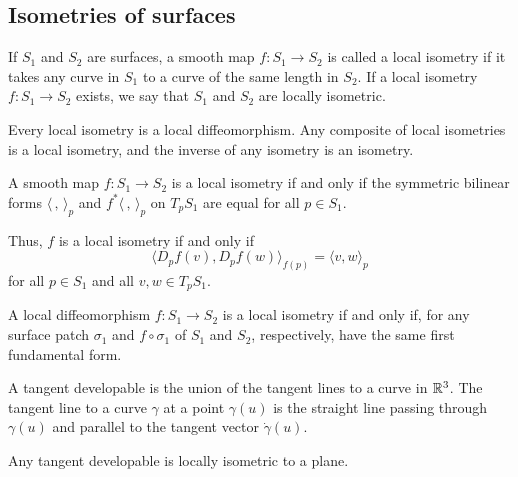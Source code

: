 \subsection{Isometries of surfaces}

\begin{defn}
  If $S_1$ and $S_2$ are surfaces, a smooth map $f: S_1 \to S_2$ is called
  a local isometry if it takes any curve in $S_1$ to a curve of the same
  length in $S_2$.
  If a local isometry $f: S_1 \to S_2$ exists,
  we say that $S_1$ and $S_2$ are locally isometric.
\end{defn}

\begin{remark}
  Every local isometry is a local diffeomorphism.
  Any composite of local isometries is a local isometry, and
  the inverse of any isometry is an isometry.
\end{remark}

\begin{theorem}
  A smooth map $f: S_1 \to S_2$ is a local isometry if and only if
  the symmetric bilinear forms $\langle\,,\,\rangle_p$ and
  $f^*\langle\,,\,\rangle_p$ on $T_p S_1$ are equal for all $p \in S_1$.
\end{theorem}

Thus, $f$ is a local isometry if and only if
\[
  \langle D_p f(v), D_p f(w) \rangle_{f(p)} =
  \langle v, w \rangle_p
\]
for all $p \in S_1$ and all $v, w \in T_p S_1$.

\begin{corollary}
  A local diffeomorphism $f: S_1 \to S_2$ is a local isometry
  if and only if, for any surface patch $\sigma_1$ and
  $f \circ \sigma_1$ of $S_1$ and $S_2$, respectively,
  have the same first fundamental form.
\end{corollary}

\begin{defn}
  A tangent developable is the union of the tangent lines to a curve in
  $\mathbb{R}^3$.
  The tangent line to a curve $\gamma$ at a point $\gamma(u)$
  is the straight line passing through $\gamma(u)$ and parallel
  to the tangent vector $\dot{\gamma}(u)$.
\end{defn}

\begin{proposition}
  Any tangent developable is locally isometric to a plane.
\end{proposition}